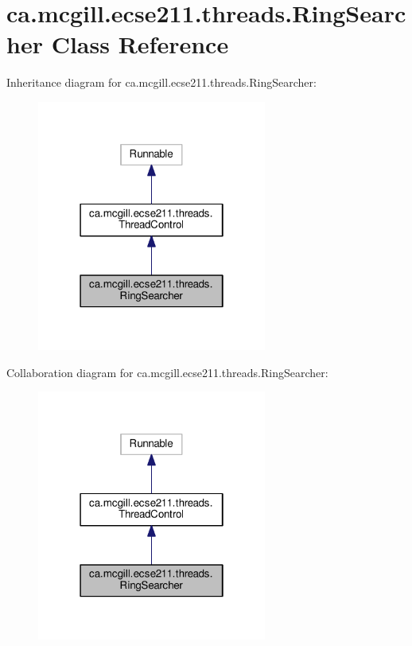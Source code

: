 \hypertarget{classca_1_1mcgill_1_1ecse211_1_1threads_1_1_ring_searcher}{}\section{ca.\+mcgill.\+ecse211.\+threads.\+Ring\+Searcher Class Reference}
\label{classca_1_1mcgill_1_1ecse211_1_1threads_1_1_ring_searcher}


Inheritance diagram for ca.\+mcgill.\+ecse211.\+threads.\+Ring\+Searcher\+:
\nopagebreak
\begin{figure}[H]
\begin{center}
\leavevmode
\includegraphics[width=214pt]{classca_1_1mcgill_1_1ecse211_1_1threads_1_1_ring_searcher__inherit__graph}
\end{center}
\end{figure}


Collaboration diagram for ca.\+mcgill.\+ecse211.\+threads.\+Ring\+Searcher\+:
\nopagebreak
\begin{figure}[H]
\begin{center}
\leavevmode
\includegraphics[width=214pt]{classca_1_1mcgill_1_1ecse211_1_1threads_1_1_ring_searcher__coll__graph}
\end{center}
\end{figure}
